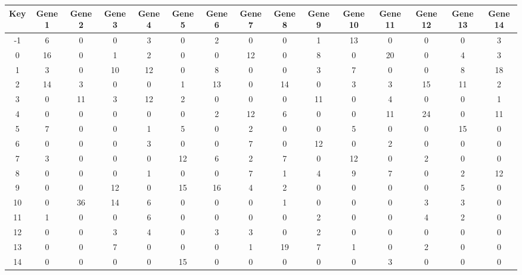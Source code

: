 \begin{tabular}{|c|c|c|c|c|c|c|c|c|c|c|c|c|c|c|}
\hline
Key & Gene 1 & Gene 2 & Gene 3 & Gene 4 & Gene 5 & Gene 6 & Gene 7 & Gene 8 & Gene 9 & Gene 10 & Gene 11 & Gene 12 & Gene 13 & Gene 14 \\
\hline
-1 & 6 & 0 & 0 & 3 & 0 & 2 & 0 & 0 & 1 & 13 & 0 & 0 & 0 & 3 \\
0 & 16 & 0 & 1 & 2 & 0 & 0 & 12 & 0 & 8 & 0 & 20 & 0 & 4 & 3 \\
1 & 3 & 0 & 10 & 12 & 0 & 8 & 0 & 0 & 3 & 7 & 0 & 0 & 8 & 18 \\
2 & 14 & 3 & 0 & 0 & 1 & 13 & 0 & 14 & 0 & 3 & 3 & 15 & 11 & 2 \\
3 & 0 & 11 & 3 & 12 & 2 & 0 & 0 & 0 & 11 & 0 & 4 & 0 & 0 & 1 \\
4 & 0 & 0 & 0 & 0 & 0 & 2 & 12 & 6 & 0 & 0 & 11 & 24 & 0 & 11 \\
5 & 7 & 0 & 0 & 1 & 5 & 0 & 2 & 0 & 0 & 5 & 0 & 0 & 15 & 0 \\
6 & 0 & 0 & 0 & 3 & 0 & 0 & 7 & 0 & 12 & 0 & 2 & 0 & 0 & 0 \\
7 & 3 & 0 & 0 & 0 & 12 & 6 & 2 & 7 & 0 & 12 & 0 & 2 & 0 & 0 \\
8 & 0 & 0 & 0 & 1 & 0 & 0 & 7 & 1 & 4 & 9 & 7 & 0 & 2 & 12 \\
9 & 0 & 0 & 12 & 0 & 15 & 16 & 4 & 2 & 0 & 0 & 0 & 0 & 5 & 0 \\
10 & 0 & 36 & 14 & 6 & 0 & 0 & 0 & 1 & 0 & 0 & 0 & 3 & 3 & 0 \\
11 & 1 & 0 & 0 & 6 & 0 & 0 & 0 & 0 & 2 & 0 & 0 & 4 & 2 & 0 \\
12 & 0 & 0 & 3 & 4 & 0 & 3 & 3 & 0 & 2 & 0 & 0 & 0 & 0 & 0 \\
13 & 0 & 0 & 7 & 0 & 0 & 0 & 1 & 19 & 7 & 1 & 0 & 2 & 0 & 0 \\
14 & 0 & 0 & 0 & 0 & 15 & 0 & 0 & 0 & 0 & 0 & 3 & 0 & 0 & 0 \\
\hline
\end{tabular}